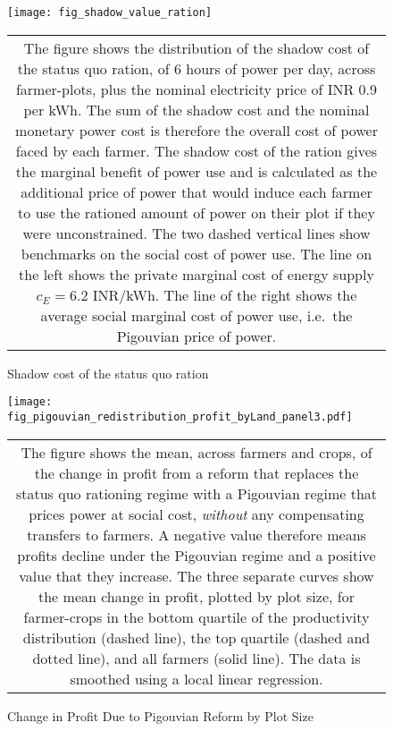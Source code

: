 \documentclass{article}
\numberwithin{table}{section}
\begin{document}
\begin{figure}[htbp]
	\centering\caption{Shadow cost of the status quo ration\label{fig:shadow}}
	\texttt{[image: fig\_shadow\_value\_ration]}
	\begin{tabular*}{1.0\hsize}{c}
		\multicolumn{1}{p{1.0\hsize}}{\footnotesize The figure shows the distribution of the shadow cost of the status quo ration, of 6 hours of power per day, across farmer-plots, plus the nominal electricity price of INR 0.9 per kWh. The sum of the shadow cost and the nominal monetary power cost is therefore the overall cost of power faced by each farmer. The shadow cost of the ration gives the marginal benefit of power use and is calculated as the additional price of power that would induce each farmer to use the rationed amount of power on their plot if they were unconstrained. The two dashed vertical lines show benchmarks on the social cost of power use. The line on the left shows the private marginal cost of energy supply $c_E = 6.2$ INR/kWh. The line of the right shows the average social marginal cost of power use, i.e.~the Pigouvian price of power.}\\
	\end{tabular*}
\end{figure}

\begin{figure}[htbp]
	\centering\caption{Change in Profit Due to Pigouvian Reform by Plot Size\label{fig:deltaProfitLand}}
	\texttt{[image: fig\_pigouvian\_redistribution\_profit\_byLand\_panel3.pdf]}
	\begin{tabular*}{1.0\hsize}{c}
		\multicolumn{1}{p{1.0\hsize}}{\footnotesize The figure shows the mean, across farmers and crops, of the change in profit from a reform that replaces the status quo rationing regime with a Pigouvian regime that prices power at social cost, \emph{without} any compensating transfers to farmers. A negative value therefore means profits decline under the Pigouvian regime and a positive value that they increase. The three separate curves show the mean change in profit, plotted by plot size, for farmer-crops in the bottom quartile of the productivity distribution (dashed line), the top quartile (dashed and dotted line), and all farmers (solid line). The data is smoothed using a local linear regression.}\\
	\end{tabular*}
\end{figure}


\renewcommand{\tabcolsep}{3pt}

\end{document}
